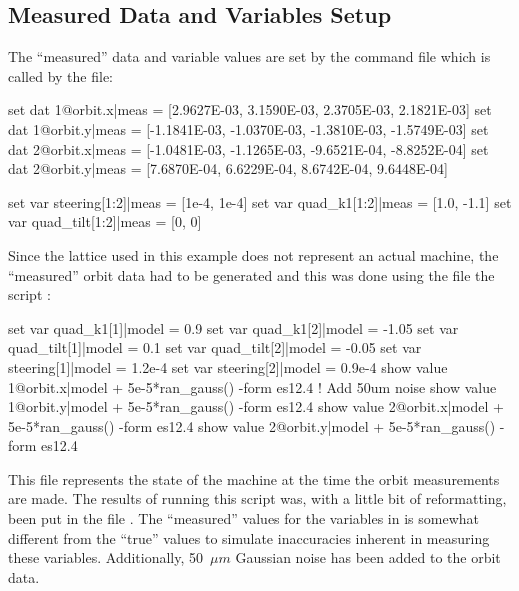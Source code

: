 \documentclass{hitec}     %
\begin{document}
{%
\subsection{Measured Data and Variables Setup}
\label{s:twiss.start}

The ``measured'' data and variable values are set by the command file  which is
called by the  file:
\begin{code}
set dat 1@orbit.x|meas = [2.9627E-03, 3.1590E-03, 2.3705E-03, 2.1821E-03]
set dat 1@orbit.y|meas = [-1.1841E-03, -1.0370E-03, -1.3810E-03, -1.5749E-03]
set dat 2@orbit.x|meas = [-1.0481E-03, -1.1265E-03, -9.6521E-04, -8.8252E-04]
set dat 2@orbit.y|meas = [7.6870E-04, 6.6229E-04, 8.6742E-04, 9.6448E-04]

set var steering[1:2]|meas = [1e-4, 1e-4]
set var quad_k1[1:2]|meas = [1.0, -1.1]
set var quad_tilt[1:2]|meas = [0, 0]
\end{code}


Since the lattice used in this example does not represent an actual machine, the ``measured'' orbit
data had to be generated and this was done using the file the script :
\begin{code}
set var quad_k1[1]|model = 0.9
set var quad_k1[2]|model = -1.05
set var quad_tilt[1]|model = 0.1    
set var quad_tilt[2]|model = -0.05
set var steering[1]|model = 1.2e-4  
set var steering[2]|model = 0.9e-4
show value 1@orbit.x|model + 5e-5*ran_gauss() -form es12.4  ! Add 50um noise
show value 1@orbit.y|model + 5e-5*ran_gauss() -form es12.4
show value 2@orbit.x|model + 5e-5*ran_gauss() -form es12.4
show value 2@orbit.y|model + 5e-5*ran_gauss() -form es12.4
\end{code}
This file represents the state of the machine at the time the orbit measurements are made.  The
results of running this script was, with a little bit of reformatting, been put in the file
. The ``measured'' values for the variables in  is somewhat
different from the ``true'' values  to simulate inaccuracies inherent in
measuring these variables. Additionally, 50~$\mu m$ Gaussian noise has been added to the orbit
data.


}
\end{document}
